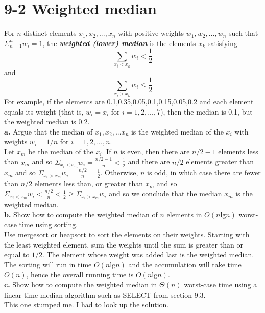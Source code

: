 \documentclass[10pt,a4paper]{article}
\begin{document}
\section*{9-2 Weighted median}
For $n$ distinct elements $x_1,x_2,...,x_n$ with positive weights $w_1,w_2,...,w_n$ such that $\Sigma_{n=1}^{n}w_i=1$, the \textbf{\textit{weighted (lower) median}} is the elements $x_k$ satisfying
\begin{displaymath}
	\displaystyle\sum_{x_i<x_k} w_i<\frac{1}{2}
\end{displaymath}
and
\begin{displaymath}
	\displaystyle\sum_{x_i>x_k} w_i\leq\frac{1}{2}
\end{displaymath}
For example, if the elements are 0.1,0.35,0.05,0.1,0.15,0.05,0.2 and each element equals its weight (that is, $w_i=x_i$ for $i=1,2,...,7$), then the median is 0.1, but the weighted median is 0.2.
\vspace*{\baselineskip}
\\
\textbf{a.} Argue that the median of $x_1,x_2,...x_n$ is the weighted median of the $x_i$ with weights $w_i=1/n$ for $i=1,2,...,n$.
\vspace*{\baselineskip}
\\
Let $x_m$ be the median of the $x_i$. If $n$ is even, then there are $n/2 - 1$ elements less than $x_m$ and so $\Sigma_{x_i<x_m} w_i = \frac{n/2 - 1}{n} < \frac{1}{2}$ and there are $n/2$ elements greater than $x_m$ and so $\Sigma_{x_i > x_m} w_i = \frac{n/2}{n} = \frac{1}{2}$. Otherwise, $n$ is odd, in which case there are fewer than $n/2$ elements less than, or greater than $x_m$ and so $\Sigma_{x_i<x_m} w_i < \frac{n/2}{n} < \frac{1}{2} \geq \Sigma_{x_i>x_m} w_i$ and so we conclude that the median $x_m$ is the weighted median.
\vspace*{\baselineskip}
\\
\textbf{b.} Show how to compute the weighted median of $n$ elements in $O(n\text{lg}n)$ worst-case time using sorting.
\vspace*{\baselineskip}
\\
Use mergesort or heapsort to sort the elements on their weights. Starting with the least weighted element, sum the weights until the sum is greater than or equal to $1/2$. The element whose weight was added last is the weighted median. The sorting will run in time $O(n\text{lg}n)$ and the accumulation will take time $O(n)$, hence the overall running time is $O(n\text{lg}n)$.
\vspace*{\baselineskip}
\\
\textbf{c.} Show how to compute the weighted median in $\Theta (n)$ worst-case time using a linear-time median algorithm such as SELECT from section 9.3.
\vspace*{\baselineskip}
\\
This one stumped me. I had to look up the solution.
\end{document}

